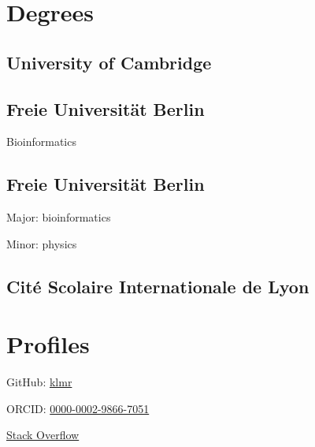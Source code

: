 \documentclass{klmr-cv}
\author{Konrad Rudolph}
\begin{document}
\maketitle

\begin{sidebar}
\section{Degrees}

\subsection{University of Cambridge}

\date{2016}
\item{}

\subsection{Freie Universität Berlin}

\date{2011}
\item{}
\item{Bioinformatics}

\subsection{Freie Universität Berlin}

\date{2008}
\item{}
\item{Major: bioinformatics}
\item{Minor: physics}

\subsection{\textfrench{Cité Scolaire Internationale de Lyon}}

\date{2003}
\item{}

\section{Profiles}

\item{GitHub: \href{http://github.com/klmr}{klmr}}
\item{ORCID: \href{http://orcid.org/0000-0002-9866-7051}{0000-0002-9866-7051}}
\item{\href{http://stackoverflow.com/users/1968/konrad-rudolph}{Stack Overflow}}


\end{sidebar}
\end{document}
